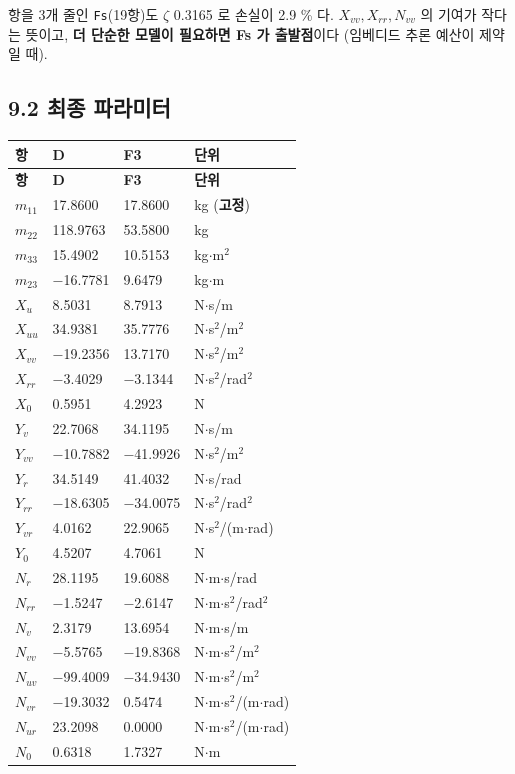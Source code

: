 \documentclass[10pt,a4paper]{article}
\begin{document}
항을 3개 줄인 \texttt{Fs}(19항)도 $\zeta$ 0.3165 로 손실이 2.9 \% 다. $X_{vv}, X_{rr}, N_{vv}$ 의 기여가 작다는 뜻이고, \textbf{더 단순한 모델이 필요하면 Fs 가 출발점}이다 (임베디드 추론 예산이 제약일 때).

\subsection*{9.2 최종 파라미터}

{\footnotesize\setlength{\tabcolsep}{3pt}
\begin{longtable}{@{}llll@{}}
\toprule
\textbf{항} & \textbf{D} & \textbf{F3} & \textbf{단위} \\
\midrule
\endfirsthead
\toprule
\textbf{항} & \textbf{D} & \textbf{F3} & \textbf{단위} \\
\midrule
\endhead
\bottomrule
\endlastfoot
$m_{11}$ & 17.8600 & 17.8600 & kg (\textbf{고정}) \\
$m_{22}$ & 118.9763 & 53.5800 & kg \\
$m_{33}$ & 15.4902 & 10.5153 & kg$\cdot$m$^2$ \\
$m_{23}$ & $-$16.7781 & 9.6479 & kg$\cdot$m \\
$X_u$ & 8.5031 & 8.7913 & N$\cdot$s/m \\
$X_{uu}$ & 34.9381 & 35.7776 & N$\cdot$s$^2$/m$^2$ \\
$X_{vv}$ & $-$19.2356 & 13.7170 & N$\cdot$s$^2$/m$^2$ \\
$X_{rr}$ & $-$3.4029 & $-$3.1344 & N$\cdot$s$^2$/rad$^2$ \\
$X_0$ & 0.5951 & 4.2923 & N \\
$Y_v$ & 22.7068 & 34.1195 & N$\cdot$s/m \\
$Y_{vv}$ & $-$10.7882 & $-$41.9926 & N$\cdot$s$^2$/m$^2$ \\
$Y_r$ & 34.5149 & 41.4032 & N$\cdot$s/rad \\
$Y_{rr}$ & $-$18.6305 & $-$34.0075 & N$\cdot$s$^2$/rad$^2$ \\
$Y_{vr}$ & 4.0162 & 22.9065 & N$\cdot$s$^2$/(m$\cdot$rad) \\
$Y_0$ & 4.5207 & 4.7061 & N \\
$N_r$ & 28.1195 & 19.6088 & N$\cdot$m$\cdot$s/rad \\
$N_{rr}$ & $-$1.5247 & $-$2.6147 & N$\cdot$m$\cdot$s$^2$/rad$^2$ \\
$N_v$ & 2.3179 & 13.6954 & N$\cdot$m$\cdot$s/m \\
$N_{vv}$ & $-$5.5765 & $-$19.8368 & N$\cdot$m$\cdot$s$^2$/m$^2$ \\
$N_{uv}$ & $-$99.4009 & $-$34.9430 & N$\cdot$m$\cdot$s$^2$/m$^2$ \\
$N_{vr}$ & $-$19.3032 & 0.5474 & N$\cdot$m$\cdot$s$^2$/(m$\cdot$rad) \\
$N_{ur}$ & 23.2098 & 0.0000 & N$\cdot$m$\cdot$s$^2$/(m$\cdot$rad) \\
$N_0$ & 0.6318 & 1.7327 & N$\cdot$m \\
\end{longtable}}
\end{document}
